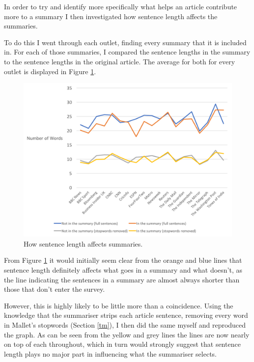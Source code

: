 \documentclass[12pt]{article}
\begin{document}
In order to try and identify more specifically what helps an article contribute more to a summary I then investigated how sentence length affects the summaries.

To do this I went through each outlet, finding every summary that it is included in. For each of those summaries, I compared the sentence lengths in the summary to the sentence lengths in the original article. The average for both for every outlet is displayed in Figure \ref{sentencestats}.

\begin{figure}[ht!]
  \centering
    \includegraphics[scale=0.5]{sentencestats.png}
   \caption[A graph depicting responses to the User Interface Survey]{How sentence length affects summaries.}
   \label{sentencestats}
\end{figure}

From Figure \ref{sentencestats} it would initially seem clear from the orange and blue lines that sentence length definitely affects what goes in a summary and what doesn't, as the line indicating the sentences in a summary are almost always shorter than those that don't enter the survey. 

However, this is highly likely to be little more than a coincidence. Using the knowledge that the summariser strips each article sentence, removing every word in Mallet's stopwords (Section \ref{tm}), I then did the same myself and reproduced the graph. As can be seen from the yellow and grey lines the lines are now nearly on top of each throughout, which in turn would strongly suggest that sentence length plays no major part in influencing what the summariser selects.
\end{document}
